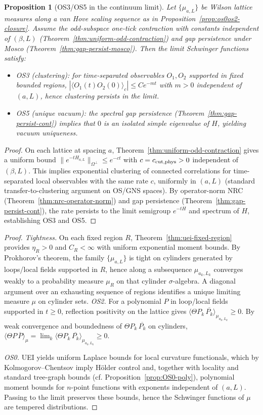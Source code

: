 \documentclass[11pt]{amsart}
\theoremstyle{plain}
\newtheorem{proposition}[theorem]{Proposition}
\theoremstyle{definition}
\theoremstyle{remark}
\begin{document}
\begin{proposition}[OS3/OS5 in the continuum limit]\label{prop:os35-limit}
Let $\{\mu_{a,L}\}$ be Wilson lattice measures along a van Hove scaling sequence as in Proposition~\ref{prop:os0os2-closure}. Assume the odd-subspace one-tick contraction with constants independent of $(\beta,L)$ (Theorem~\ref{thm:uniform-odd-contraction}) and gap persistence under Mosco (Theorem~\ref{thm:gap-persist-mosco}). Then the limit Schwinger functions satisfy:
\begin{itemize}
  \item OS3 (clustering): for time-separated observables $O_1,O_2$ supported in fixed bounded regions, $|\langle O_1(t)O_2(0)\rangle_c|\le C e^{-m t}$ with $m>0$ independent of $(a,L)$, hence clustering persists in the limit.
  \item OS5 (unique vacuum): the spectral gap persistence (Theorem~\ref{thm:gap-persist-cont}) implies that $0$ is an isolated simple eigenvalue of $H$, yielding vacuum uniqueness.
\end{itemize}
\end{proposition}
\begin{proof}
On each lattice at spacing $a$, Theorem~\ref{thm:uniform-odd-contraction} gives a uniform bound $\|e^{-tH_{a,L}}\|_{\Omega^{\perp}}\le e^{-c t}$ with $c= c_{\rm cut,phys}>0$ independent of $(\beta,L)$. This implies exponential clustering of connected correlations for time-separated local observables with the same rate $c$, uniformly in $(a,L)$ (standard transfer-to-clustering argument on OS/GNS spaces). By operator-norm NRC (Theorem~\ref{thm:nrc-operator-norm}) and gap persistence (Theorem~\ref{thm:gap-persist-cont}), the rate persists to the limit semigroup $e^{-tH}$ and spectrum of $H$, establishing OS3 and OS5.
\end{proof}
\begin{proof}
\emph{Tightness.} On each fixed region $R$, Theorem~\ref{thm:uei-fixed-region} provides $\eta_R>0$ and $C_R<\infty$ with uniform exponential moment bounds. By Prokhorov's theorem, the family $\{\mu_{a,L}\}$ is tight on cylinders generated by loops/local fields supported in $R$, hence along a subsequence $\mu_{a_k,L_k}$ converges weakly to a probability measure $\mu_R$ on that cylinder $\sigma$-algebra. A diagonal argument over an exhausting sequence of regions identifies a unique limiting measure $\mu$ on cylinder sets.
\emph{OS2.} For a polynomial $P$ in loop/local fields supported in $t\ge 0$, reflection positivity on the lattice gives $\langle \Theta P_k\,\overline{P_k}\rangle_{\mu_{a_k,L_k}}\ge 0$. By weak convergence and boundedness of $\Theta P_k\,\overline{P_k}$ on cylinders, $\langle \Theta P\,\overline{P}\rangle_{\mu}=\lim_k \langle \Theta P_k\,\overline{P_k}\rangle_{\mu_{a_k,L_k}}\ge 0$.

\emph{OS0.} UEI yields uniform Laplace bounds for local curvature functionals, which by Kolmogorov--Chentsov imply Hölder control and, together with locality and standard tree-graph bounds (cf. Proposition~\ref{prop:OS0-poly}), polynomial moment bounds for $n$-point functions with exponents independent of $(a,L)$. Passing to the limit preserves these bounds, hence the Schwinger functions of $\mu$ are tempered distributions.
\end{proof}
\end{document}
